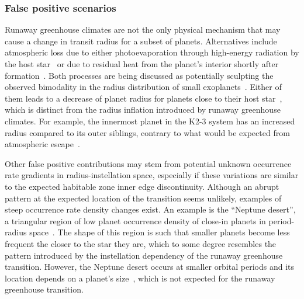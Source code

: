 \documentclass[twocolumn,twocolappendix]{aastex631}
\begin{document}
\subsubsection{False positive scenarios}\label{sec:dis_falsepositive}
Runaway greenhouse climates are not the only physical mechanism that may cause a change in transit radius for a subset of planets.
Alternatives include atmospheric loss due to either photoevaporation through high-energy radiation by the host star~\citep[e.g.,][]{2012ApJ...753...66I,Owen2013,Jin2014,Mordasini2020a} or due to residual heat from the planet's interior shortly after formation~\citep{Ginzburg2016b,Ginzburg2018,Gupta2019}.
Both processes are being discussed as potentially sculpting the observed bimodality in the radius distribution of small exoplanets~\citep{Fulton2017,VanEylen2018}.
Either of them leads to a decrease of planet radius for planets close to their host star~\citep{Pascucci2019,Bergsten2022}, which is distinct from the radius inflation introduced by runaway greenhouse climates.
For example, the innermost planet in the \mbox{K2-3} system has an increased radius compared to its outer siblings, contrary to what would be expected from atmospheric escape~\citep{2022AJ....164..172D}.

Other false positive contributions may stem from potential unknown occurrence rate gradients in radius-instellation space, especially if these variations are similar to the expected habitable zone inner edge discontinuity.
Although an abrupt pattern at the expected location of the transition seems unlikely, examples of steep occurrence rate density changes exist.
An example is the ``Neptune desert'', a triangular region of low planet occurrence density of close-in planets in period-radius space~\citep{Szabo2011,Mazeh2016,Dreizler2020b}.
The shape of this region is such that smaller planets become less frequent the closer to the star they are, which to some degree resembles the pattern introduced by the instellation dependency of the runaway greenhouse transition.
However, the Neptune desert occurs at smaller orbital periods and its location depends on a planet's size~\citep{Szabo2011}, which is not expected for the runaway greenhouse transition.
\end{document}
